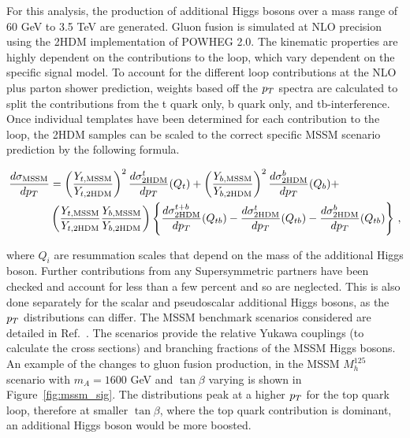 For this analysis, the production of additional Higgs bosons over a mass range of 60 GeV to 3.5 TeV are generated.
Gluon fusion is simulated at NLO precision using the 2HDM implementation of POWHEG 2.0.
The kinematic properties are highly dependent on the contributions to the loop, which vary dependent on the specific signal model.
To account for the different loop contributions at the NLO plus parton shower prediction, weights based off the $p_{T}$ spectra are calculated to split the contributions from the t quark only, b quark only, and tb-interference.
Once individual templates have been determined for each contribution to the loop, the 2HDM samples can be scaled to the correct specific MSSM scenario prediction by the following formula.

\begin{equation}
\begin{aligned}
\frac{d\sigma_{\text{MSSM}}}{dp_{T}} & = \left(\frac{Y_{t,\text{MSSM}}}{Y_{t,\text{2HDM}}}\right)^{2}\frac{d\sigma^{t}_{\text{2HDM}}}{dp_{T}}(Q_{t}) + \left(\frac{Y_{b,\text{MSSM}}}{Y_{b,\text{2HDM}}}\right)^{2}\frac{d\sigma^{b}_{\text{2HDM}}}{dp_{T}}(Q_{b}) + \nonumber \\
& \left(\frac{Y_{t,\text{MSSM}}}{Y_{t,\text{2HDM}}}\frac{Y_{b,\text{MSSM}}}{Y_{b,\text{2HDM}}}\right) \left\{ \frac{d\sigma^{t+b}_{\text{2HDM}}}{dp_{T}}(Q_{tb}) - \frac{d\sigma^{t}_{\text{2HDM}}}{dp_{T}}(Q_{tb}) - \frac{d\sigma^{b}_{\text{2HDM}}}{dp_{T}}(Q_{tb}) \right\} \,,
\end{aligned}
\label{eqn:ggh_reweight}
\end{equation} 

where $Q_i$ are resummation scales that depend on the mass of the additional Higgs boson.
Further contributions from any Supersymmetric partners have been checked and account for less than a few percent and so are neglected.
This is also done separately for the scalar and pseudoscalar additional Higgs bosons, as the $p_{T}$ distributions can differ.
The MSSM benchmark scenarios considered are detailed in Ref.~\cite{}.
The scenarios provide the relative Yukawa couplings (to calculate the cross sections) and branching fractions of the MSSM Higgs bosons.
An example of the changes to gluon fusion production, in the MSSM $M_{h}^{125}$ scenario with $m_{A} = 1600$ GeV and $\tan\beta$ varying is shown in Figure~\ref{fig:mssm_sig}.
The distributions peak at a higher $p_{T}$ for the top quark loop, therefore at smaller $\tan\beta$, where the top quark contribution is dominant, an additional Higgs boson would be more boosted. \\

